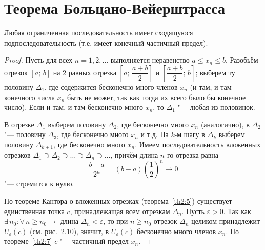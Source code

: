 \section{Теорема Больцано-Вейерштрасса}

\begin{thm} \label{th2:8}
Любая ограниченная последовательность имеет сходящуюся подпоследовательность (т.е. имеет конечный частичный предел).
\end{thm}

\begin{proof}
Пусть для всех $n = 1, 2, \ldots$ выполняется неравенство $a \le x_n \le b$. Разобьём отрезок $[a;\, b]$ на 2 равных отрезка $\left[a;\, \dfrac{a+b}{2}\right]$ и $\left[\dfrac{a+b}{2};\, b\right]$; выберем ту половину $\Delta_1$, где содержится бесконечно много членов $x_n$ (и там, и там конечного числа $x_n$ быть не может, так как тогда их всего было бы конечное число). Если и там, и там бесконечно много $x_n$, то $\Delta_1$ "--- любая из половинок.

В отрезке $\Delta_1$ выберем половину $\Delta_2$, где бесконечно много $x_n$ (аналогично), в $\Delta_2$ "--- половину $\Delta_3$, где бесконечно много $x_n$ и т.д. На $k$-м шагу в $\Delta_k$ выберем половину $\Delta_{k+1}$, где бесконечно много $x_n$. Имеем последовательность вложенных отрезков $\Delta_1 \supset \Delta_2 \supset \ldots \supset \Delta_n \supset \ldots$, причём длина $n$-го отрезка равна
$$
\frac{b - a}{2^n} = (b - a) \left(\frac{1}{2}\right)^n \to 0
$$
"--- стремится к нулю.

По теореме Кантора о вложенных отрезках (теорема~\ref{th2:5}) существует единственная точка $c$, принадлежащая всем отрезкам $\Delta_n$. Пусть $\varepsilon > 0$. Так как $\exists\, n_0 \colon \forall\, n \ge n_0 \longrightarrow$ длина $\Delta_n < \varepsilon$, то при $n \ge n_0$ отрезок $\Delta_n$ целиком принадлежит $U_\varepsilon(c)$ (см. рис.~2.10), значит, в $U_\varepsilon(c)$ бесконечно много членов $x_n$. По теореме~\ref{th2:7} $c$ "--- частичный предел $x_n$.
\end{proof}


